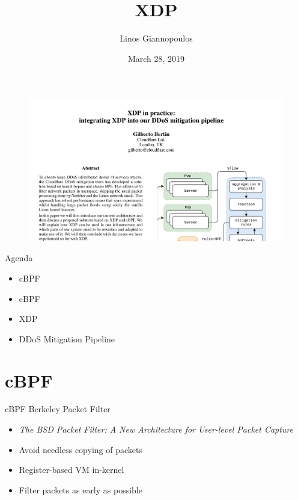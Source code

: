 \documentclass{beamer}
\title[XDP]{XDP}
\author{Linos Giannopoulos}
\date{March 28, 2019}
\begin{document}
\begin{frame}
\titlepage
\end{frame}

\begin{frame}[c]
  \begin{figure}
    \includegraphics[width=\textwidth]{./paper.png}
  \end{figure}
\end{frame}

\begin{frame}{Agenda}
  \begin{itemize}
    \item cBPF
    \item eBPF
    \item XDP
    \item DDoS Mitigation Pipeline
  \end{itemize}
\end{frame}

\section{cBPF}
\begin{frame}{cBPF}
Berkeley Packet Filter
\begin{itemize}
\item \textit{The BSD Packet Filter: A New Architecture for User-level Packet Capture}
\item Avoid needless copying of packets
\item Register-based VM in-kernel
\item Filter packets as early as possible
\end{itemize}
\end{frame}
\end{document}
